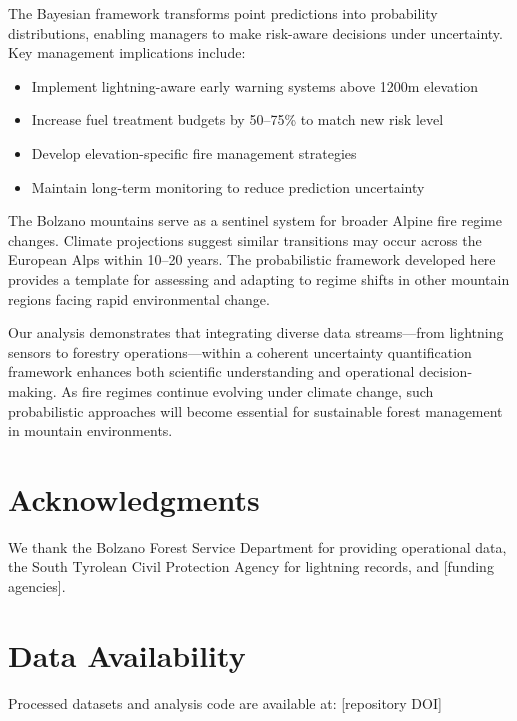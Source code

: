 \documentclass[11pt,a4paper]{article}
\begin{document}
The Bayesian framework transforms point predictions into probability distributions, enabling managers to make risk-aware decisions under uncertainty. Key management implications include:
\begin{itemize}
    \item Implement lightning-aware early warning systems above 1200m elevation
    \item Increase fuel treatment budgets by 50--75\% to match new risk level
    \item Develop elevation-specific fire management strategies
    \item Maintain long-term monitoring to reduce prediction uncertainty
\end{itemize}

The Bolzano mountains serve as a sentinel system for broader Alpine fire regime changes. Climate projections suggest similar transitions may occur across the European Alps within 10--20 years. The probabilistic framework developed here provides a template for assessing and adapting to regime shifts in other mountain regions facing rapid environmental change.

Our analysis demonstrates that integrating diverse data streams---from lightning sensors to forestry operations---within a coherent uncertainty quantification framework enhances both scientific understanding and operational decision-making. As fire regimes continue evolving under climate change, such probabilistic approaches will become essential for sustainable forest management in mountain environments.

\section*{Acknowledgments}
We thank the Bolzano Forest Service Department for providing operational data, the South Tyrolean Civil Protection Agency for lightning records, and [funding agencies]. 

\section*{Data Availability}
Processed datasets and analysis code are available at: [repository DOI]
\end{document}
